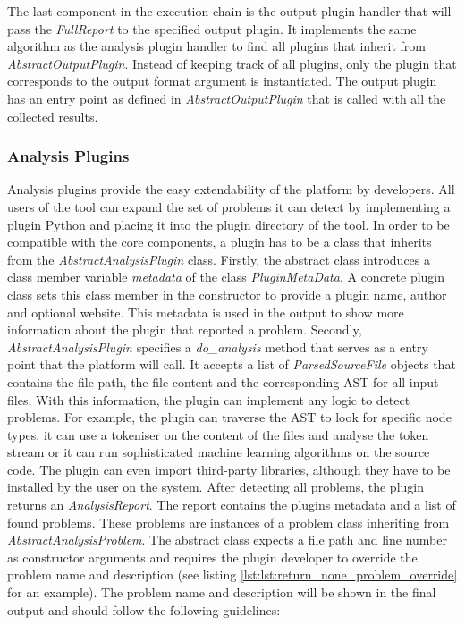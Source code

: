 The last component in the execution chain is the output plugin handler that will pass the \textit{FullReport} to the specified output plugin. It implements the same algorithm as the analysis plugin handler to find all plugins that inherit from \textit{AbstractOutputPlugin}. Instead of keeping track of all plugins, only the plugin that corresponds to the output format argument is instantiated. The output plugin has an entry point as defined in \textit{AbstractOutputPlugin}  that is called with all the collected results.

\subsubsection{Analysis Plugins}\label{sec:analysis_plugins}
Analysis plugins provide the easy extendability of the platform by developers. All users of the tool can expand the set of problems it can detect by implementing a plugin Python and placing it into the plugin directory of the tool. In order to be compatible with the core components, a plugin has to be a class that inherits from the \textit{AbstractAnalysisPlugin} class. Firstly, the abstract class introduces a class member variable \textit{metadata} of the class \textit{PluginMetaData}. A concrete plugin class sets this class member in the constructor to provide a plugin name, author and optional website. This metadata is used in the output to show more information about the plugin that reported a problem. Secondly, \textit{AbstractAnalysisPlugin} specifies a \textit{do\_analysis} method that serves as a entry point that the platform will call. It accepts a list of \textit{ParsedSourceFile} objects that contains the file path, the file content and the corresponding AST for all input files. With this information, the plugin can implement any logic to detect problems. 
For example, the plugin can traverse the AST to look for specific node types, it can use a tokeniser on the content of the files and analyse the token stream or it can run sophisticated machine learning algorithms on the source code.
The plugin can even import third-party libraries, although they have to be installed by the user on the system. After detecting all problems, the plugin returns an \textit{AnalysisReport}. The report contains the plugins metadata and a list of found problems. These problems are instances of a problem class inheriting from \textit{AbstractAnalysisProblem}. The abstract class expects a file path and line number as constructor arguments and requires the plugin developer to override the problem name and description (see listing \ref{lst:lst:return_none_problem_override} for an example). The problem name and description will be shown in the final output and should follow the following guidelines:



